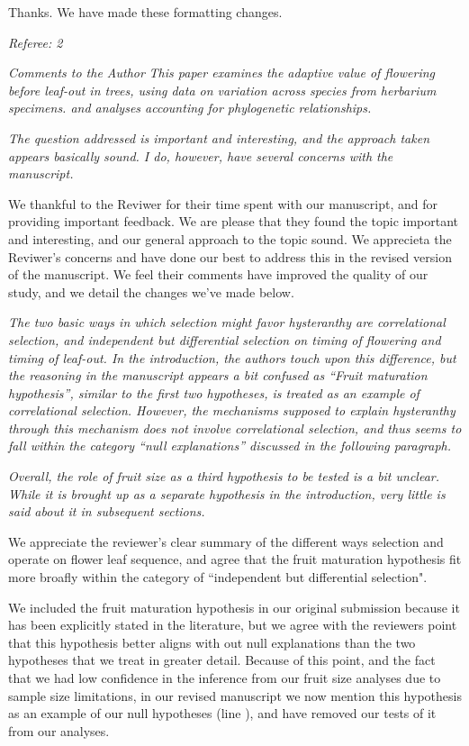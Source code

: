 \documentclass{article}[12pt]
\begin{document}
Thanks. We have made these formatting changes.

\emph{Referee: 2}

\emph{Comments to the Author}
\emph{This paper examines the adaptive value of flowering before leaf-out in trees, using data on variation across species from herbarium specimens. and analyses accounting for phylogenetic relationships.}

\emph{The question addressed is important and interesting, and the approach taken appears basically sound. I do, however, have several concerns with the manuscript.}

We thankful to the Reviwer for their time spent with our manuscript, and for providing important feedback. We are please that they found the topic important and interesting, and our general approach to the topic sound. We apprecieta the  Reviwer's concerns and have done our best to address this in the revised version of the manuscript. We feel their comments have improved the quality of our study, and we detail the changes we've made below.

\emph{The two basic ways in which selection might favor hysteranthy are correlational selection, and independent but differential selection on timing of flowering and timing of leaf-out. In the introduction, the authors touch upon this difference, but the reasoning in the manuscript appears a bit confused as “Fruit maturation hypothesis”, similar to the first two hypotheses, is treated as an example of correlational selection. However, the mechanisms supposed to explain hysteranthy through this mechanism does not involve correlational selection, and thus seems to fall within the category “null explanations” discussed in the following paragraph.}

\emph{Overall, the role of fruit size as a third hypothesis to be tested is a bit unclear. While it is brought up as a separate hypothesis in the introduction, very little is said about it in subsequent sections.}

We appreciate the reviewer's clear summary of the different ways selection and operate on flower leaf sequence, and agree that the fruit maturation hypothesis fit more broafly within the category of ``independent but differential selection".

We included the fruit maturation hypothesis in our original submission because it has been explicitly stated in the literature, but we agree with the reviewers point that this hypothesis better aligns with out null explanations than the two hypotheses that we treat in greater detail. Because of this point, and the fact that we had low confidence in the inference from our fruit size analyses due to sample size limitations, in our revised manuscript we now mention this hypothesis as an example of our null hypotheses (line ), and have removed our tests of it from our analyses.
\end{document}
